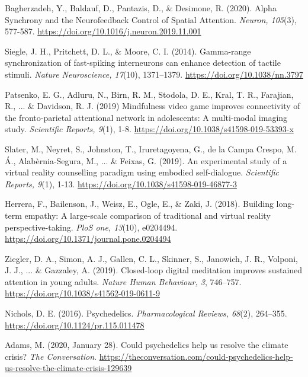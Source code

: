 \documentclass[12pt]{report}
\begin{document}
{\begin{compactenum}[i)]
  \item Bagherzadeh, Y., Baldauf, D., Pantazis, D., \& Desimone, R. (2020). Alpha Synchrony and the Neurofeedback Control of Spatial Attention. \emph{Neuron, 105}(3), 577-587. \url{https://doi.org/10.1016/j.neuron.2019.11.001}
  \item Siegle, J. H., Pritchett, D. L., \& Moore, C. I. (2014). Gamma-range synchronization of fast-spiking interneurons can enhance detection of tactile stimuli. \emph{Nature Neuroscience, 17}(10), 1371–1379. \url{https://doi.org/10.1038/nn.3797}
  \item Patsenko, E. G., Adluru, N., Birn, R. M., Stodola, D. E., Kral, T. R., Farajian, R., ... \& Davidson, R. J. (2019) Mindfulness video game improves connectivity of the fronto-parietal attentional network in adolescents: A multi-modal imaging study. \emph{Scientific Reports, 9}(1), 1-8. \url{https://doi.org/10.1038/s41598-019-53393-x}
  \item Slater, M., Neyret, S., Johnston, T., Iruretagoyena, G., de la Campa Crespo, M. Á., Alabèrnia-Segura, M., ... \& Feixas, G. (2019). An experimental study of a virtual reality counselling paradigm using embodied self-dialogue. \emph{Scientific Reports, 9}(1), 1-13. \url{https://doi.org/10.1038/s41598-019-46877-3}
  \item Herrera, F., Bailenson, J., Weisz, E., Ogle, E., \& Zaki, J. (2018). Building long-term empathy: A large-scale comparison of traditional and virtual reality perspective-taking. \emph{PloS one, 13}(10), e0204494. \url{https://doi.org/10.1371/journal.pone.0204494}
  \item Ziegler, D. A., Simon, A. J., Gallen, C. L., Skinner, S., Janowich, J. R., Volponi, J. J., ... \& Gazzaley, A. (2019). Closed-loop digital meditation improves sustained attention in young adults. \emph{Nature Human Behaviour, 3}, 746–757. \url{https://doi.org/10.1038/s41562-019-0611-9}
  \item Nichols, D. E. (2016). Psychedelics. \emph{Pharmacological Reviews, 68}(2), 264–355. \url{https://doi.org/10.1124/pr.115.011478}
  \item Adams, M. (2020, January 28). Could psychedelics help us resolve the climate crisis? \emph{The Conversation}. \url{https://theconversation.com/could-psychedelics-help-us-resolve-the-climate-crisis-129639}
\end{compactenum}\vspace{-1.3em}}
\end{document}
